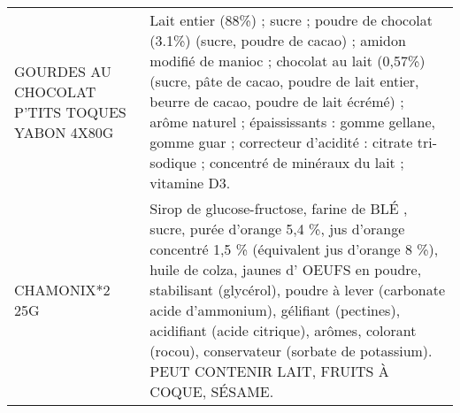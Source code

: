 \begin{longtable}{p{5cm}p{10cm}}
                                                            GOURDES AU CHOCOLAT P'TITS TOQUES YABON 4X80G &                                                                                                                                                                                                                                                                                                                                                                                                                                                                                                                                                                                                                                                       Lait entier (88\%) ; sucre ; poudre de chocolat (3.1\%) (sucre, poudre de cacao) ; amidon modifié de manioc ; chocolat au lait (0,57\%) (sucre, pâte de cacao, poudre de lait entier, beurre de cacao, poudre de lait écrémé) ; arôme naturel ; épaississants : gomme gellane, gomme guar ; correcteur d'acidité : citrate tri-sodique ; concentré de minéraux du lait ; vitamine D3. \\
                                                                                          CHAMONIX*2 25G  &                                                                                                                                                                                                                                                                                                                                                                                                                                                                                                                                                                                                                        Sirop de glucose-fructose, farine de BLÉ , sucre, purée d'orange 5,4 \%, jus d'orange concentré 1,5 \% (équivalent jus d'orange 8 \%), huile de colza, jaunes d' OEUFS en poudre, stabilisant (glycérol), poudre à lever (carbonate acide d'ammonium), gélifiant (pectines), acidifiant (acide citrique), arômes, colorant (rocou), conservateur (sorbate de potassium). PEUT CONTENIR LAIT, FRUITS À COQUE, SÉSAME. \\

\end{longtable}
